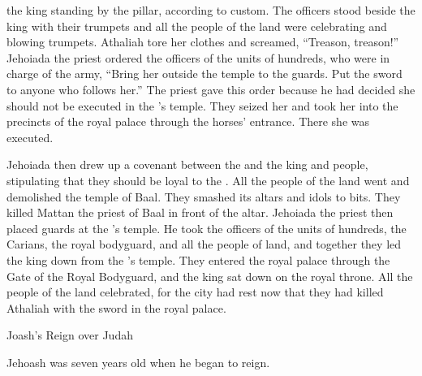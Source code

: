 {the king
standing
by the pillar,
according
to custom.
The officers
stood beside the king
with their trumpets
and all
the people
of the land
were celebrating
and blowing
trumpets.
Athaliah
tore
her clothes
and screamed,
“Treason,
treason!”
Jehoiada
the priest
ordered
the
officers
of the units of hundreds,
who were
in charge of the army, “Bring
her outside
the temple
to the guards.
Put
the sword
to
anyone
who follows her.” The priest
gave this order because
he had decided she should not
be executed
in the
{}’s
temple.
They seized
her and took
her into the precincts
of the royal
palace
through the horses’
entrance.
There
she was executed.
\par }{\PP {}Jehoiada
then drew
up a covenant
between
the {}
and the king
and people,
stipulating
that they should
be
loyal to the
{}.
All
the people
of the land
went
and demolished
the temple
of Baal.
They smashed
its altars
and idols
to bits.
They killed
Mattan
the priest
of Baal
in front
of the altar.
Jehoiada the priest
then placed
guards
at
the
{}’s
temple.
He took
the
officers
of the
units of hundreds,
the Carians,
the royal bodyguard,
and all
the people
of land,
and together they led the king
down
from the
{}’s
temple.
They entered
the royal
palace
through
the Gate
of the Royal Bodyguard,
and the king
sat
down on
the royal
throne.
All
the people
of the land
celebrated,
for the city
had rest
now that they had killed
Athaliah
with the sword
in the royal
palace.
\par }{\SH Joash’s Reign over Judah
\par }{\PP {} Jehoash
was seven
years
old when he began to reign.

}
